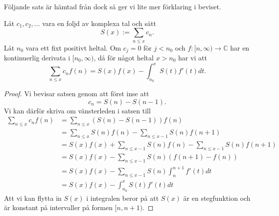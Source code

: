 Följande sats är hämtad från \cite[Sats 1.3.1]{cojocarumurty} dock så ger vi lite mer förklaring i beviset.
\begin{theorem}\label{APDX:parSum}
Låt \(c_1,c_2,...\) vara en foljd av komplexa tal och sätt
\begin{equation}
    S(x) := \sum_{n\leq x}c_n.\nonumber
\end{equation}
Låt \(n_0\) vara ett fixt positivt heltal. Om \(c_j = 0\) för \(j < n_0\) och \(f:[n, \infty) \longrightarrow\mathbb{C}\) har en kontinuerlig derivata i \([n_0, \infty)\), då för något heltal \(x > n_0\) har vi att
\begin{equation*}
    \sum_{n \leq x} c_n f(n) = S(x)f(x) - \int_{n_0}^xS(t)f'(t)dt.
\end{equation*}
\end{theorem}
\begin{proof}
Vi bevisar satsen genom att först inse att
\begin{equation*}
    c_n = S(n) - S(n-1).
\end{equation*}
Vi kan därför skriva om vänsterleden i satsen till
\begin{align*}
    \sum_{n \leq x} c_n f(n) &= \sum_{n \leq x} (S(n) - S(n-1)) f(n)\\
    &= \sum_{n \leq x} S(n) f(n) - \sum_{n \leq x-1} S(n) f(n+1)\\
    &= S(x)f(x) + \sum_{n \leq x-1} S(n) f(n) - \sum_{n \leq x-1} S(n) f(n+1)\\
    &= S(x)f(x) - \sum_{n \leq x-1} S(n) (f(n+1)-f(n))\\
    &= S(x)f(x) - \sum_{n \leq x-1} S(n) \int_n^{n+1}f'(t)dt\\
    &= S(x)f(x) - \int_{n_0}^{x}S(t)f'(t)dt
\end{align*}
Att vi kan flytta in \(S(x)\) i integralen beror på att \(S(x)\) är en stegfunktion och är konstant på intervaller på formen \([n, n+1)\).
\end{proof}